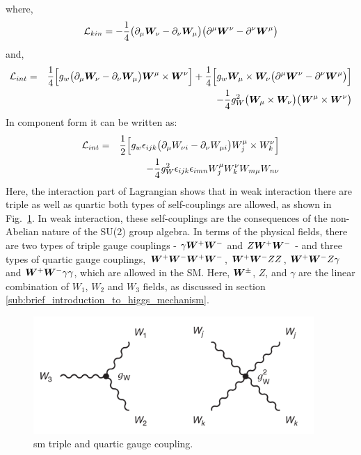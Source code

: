 where,
\begin{equation}
    \mathcal{L}_{kin} = -\frac{1}{4} \big( \partial_{\mu} \boldsymbol{W}_{\nu} - \partial_{\nu} \boldsymbol{W}_{\mu} \big) \big( \partial^{\mu} \boldsymbol{W}^{\nu} - \partial^{\nu} \boldsymbol{W}^{\mu} \big) \nonumber
\end{equation}
and,
\begin{eqnarray}
    \mathcal{L}_{int} & = &  \frac{1}{4} \Big[  g_w\big( \partial_{\mu} \boldsymbol{W}_{\nu} - \partial_{\nu} \boldsymbol{W}_{\mu} \big)\boldsymbol{W}^{\mu} \times \boldsymbol{W}^{\nu} \Big] + \frac{1}{4} \Big[  g_w \boldsymbol{W}_{\mu} \times \boldsymbol{W}_{\nu}  \big( \partial^{\mu} \boldsymbol{W}^{\nu} - \partial^{\nu} \boldsymbol{W}^{\mu} \big)\Big] \nonumber \\
        &   & - \frac{1}{4} g_W^2 \big(\boldsymbol{W}_{\mu} \times \boldsymbol{W}_{\nu}\big) \big(\boldsymbol{W}^{\mu} \times \boldsymbol{W}^{\nu}\big) 
\end{eqnarray}
In component form it can be written as:
\begin{eqnarray}
    \mathcal{L}_{int} & = & \frac{1}{2} \Big[  g_w \epsilon_{ijk}\big( \partial_{\mu} W_{\nu i} - \partial_{\nu} W_{\mu i} \big)W^{\mu}_j \times W^{\nu}_k \Big] \nonumber \\
        &   & - \frac{1}{4} g_W^2 \epsilon_{ijk} \epsilon_{imn} W^{\mu}_j W^{\nu}_k W_{m \mu} W_{n \nu}
\end{eqnarray}
Here, the interaction part of Lagrangian shows that in weak interaction there are triple as well as quartic both types of self-couplings are allowed, as shown in Fig.~\ref{fig:sm_triple_quartic}. In weak interaction, these self-couplings are the consequences of the non-Abelian nature of the SU(2) group algebra. 
{\color{red}In terms of the physical fields, there are two types of triple gauge couplings - $\gamma \boldsymbol{W}^+\boldsymbol{W}^-$ and $Z \boldsymbol{W}^+\boldsymbol{W}^-$ - and three types of quartic gauge couplings, $\boldsymbol{W}^+\boldsymbol{W}^- \boldsymbol{W}^+\boldsymbol{W}^-$, $\boldsymbol{W}^+\boldsymbol{W}^- ZZ$, $\boldsymbol{W}^+\boldsymbol{W}^- Z \gamma$ and $\boldsymbol{W}^+\boldsymbol{W}^- \gamma \gamma$, which are allowed in the SM.
Here, $\boldsymbol{W}^\pm$, $Z$, and $\gamma$ are the linear combination of $W_1$, $W_2$ and $W_3$ fields, as discussed in section \ref{sub:brief_introduction_to_higgs_mechanism}.}
\begin{figure}[htbp]
    \centering
    \includegraphics[width=0.95\textwidth]{Pictures/sm-triple-quarticgc.png}
    \caption{sm triple and quartic gauge coupling.}
    \label{fig:sm_triple_quartic}
\end{figure}


